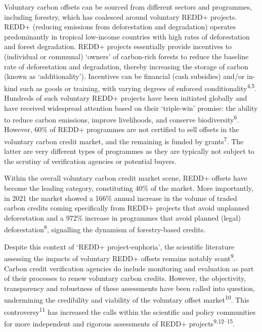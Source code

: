 \documentclass[
]{article}
\begin{document}
Voluntary carbon offsets can be sourced from different sectors and
programmes, including forestry, which has coalesced around voluntary
REDD+ projects. REDD+ (reducing emissions from deforestation and
degradation) operates predominantly in tropical low-income countries
with high rates of deforestation and forest degradation. REDD+ projects
essentially provide incentives to (individual or communal) `owners' of
carbon-rich forests to reduce the baseline rate of deforestation and
degradation, thereby increasing the storage of carbon (known as
`additionality'). Incentives can be financial (cash subsidies) and/or
in-kind such as goods or training, with varying degrees of enforced
conditionality\textsuperscript{4,5}. Hundreds of such voluntary REDD+
projects have been initiated globally and have received widespread
attention based on their `triple-win' promise: the ability to reduce
carbon emissions, improve livelihoods, and conserve
biodiversity\textsuperscript{6}. However, 60\% of REDD+ programmes are
not certified to sell offsets in the voluntary carbon credit market, and
the remaining is funded by grants\textsuperscript{7}. The latter are
very different types of programmes as they are typically not subject to
the scrutiny of verification agencies or potential buyers.

Within the overall voluntary carbon credit market scene, REDD+ offsets
have become the leading category, constituting 40\% of the market. More
importantly, in 2021 the market showed a 166\% annual increase in the
volume of traded carbon credits coming specifically from REDD+ projects
that avoid unplanned deforestation and a 972\% increase in programmes
that avoid planned (legal) deforestation\textsuperscript{8}, signalling
the dynamism of forestry-based credits.

Despite this context of `REDD+ project-euphoria', the scientific
literature assessing the impacts of voluntary REDD+ offsets remains
notably scant\textsuperscript{9}. Carbon credit verification agencies do
include monitoring and evaluation as part of their processes to renew
voluntary carbon credits. However, the objectivity, transparency and
robustness of these assessments have been called into question,
undermining the credibility and viability of the voluntary offset
market\textsuperscript{10}. This controversy\textsuperscript{11} has
increased the calls within the scientific and policy communities for
more independent and rigorous assessments of REDD+
projects\textsuperscript{9,12--15}.
\end{document}
